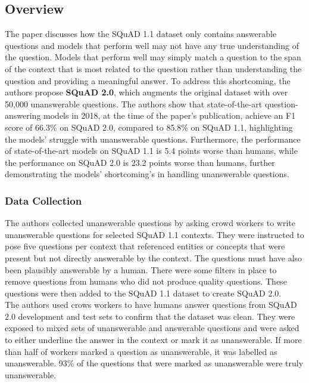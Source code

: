 \documentclass[letterpaper, 11pt]{article}
\begin{document}
\subsection{Overview}
The paper discusses how the SQuAD 1.1 dataset only contains answerable questions and models that perform well may not have any true understanding of the question.
Models that perform well may simply match a question to the span of the context that is most related to the question rather than understanding the question and providing a meaningful answer.
To address this shortcoming, the authors propose \textbf{SQuAD 2.0}, which augments the original dataset with over 50,000 unanswerable questions.
The authors show that state-of-the-art question-answering models in 2018, at the time of the paper's publication, achieve an F1 score of 66.3\% on SQuAD 2.0, compared to 85.8\% on SQuAD 1.1, highlighting the models' struggle with unanswerable questions.
Furthermore, the performance of state-of-the-art models on SQuAD 1.1 is 5.4 points worse than humans, while the performance on SQuAD 2.0 is 23.2 points worse than humans, further demonstrating the models' shortcoming's in handling unanswerable questions.


\subsubsection{Data Collection}
The authors collected unanswerable questions by asking crowd workers to write unanswerable questions for selected SQuAD 1.1 contexts. They were instructed
to pose five questions per context that referenced entities or concepts that were present but not directly answerable by the context. The questions must have also been plausibly answerable by a human. There were some filters
in place to remove questions from humans who did not produce quality questions. These questions were then added to the SQuAD 1.1 dataset to create SQuAD 2.0.
\\
The authors used crows workers to have humans answer questions from SQuAD 2.0 development and test sets to confirm that the dataset was clean. They were exposed to mixed sets of unanswerable and answerable questions and were asked to either 
underline the answer in the context or mark it as unanswerable. If more than half of workers marked a question as unanswerable, it was labelled as unanswerable. 93\% of the questions
that were marked as unanswerable were truly unanswerable. 

\end{document}
